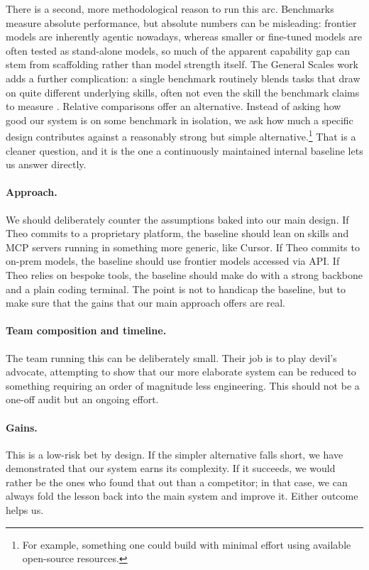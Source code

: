 There is a second, more methodological reason to run this arc. Benchmarks measure absolute performance, but absolute numbers can be misleading: frontier models are inherently agentic nowadays, whereas smaller or fine-tuned models are often tested as stand-alone models, so much of the apparent capability gap can stem from scaffolding rather than model strength itself. The General Scales work adds a further complication: a single benchmark routinely blends tasks that draw on quite different underlying skills, often not even the skill the benchmark claims to measure \cite{Zhou2026}. Relative comparisons offer an alternative. Instead of asking how good our system is on some benchmark in isolation, we ask how much a specific design contributes against a reasonably strong but simple alternative.\footnote{
    For example, something one could build with minimal effort using available open-source resources.
}
That is a cleaner question, and it is the one a continuously maintained internal baseline lets us answer directly.

\paragraph{Approach.}
We should deliberately counter the assumptions baked into our main design. If Theo commits to a proprietary platform, the baseline should lean on skills and MCP servers running in something more generic, like Cursor. If Theo commits to on-prem models, the baseline should use frontier models accessed via API. If Theo relies on bespoke tools, the baseline should make do with a strong backbone and a plain coding terminal. The point is not to handicap the baseline, but to make sure that the gains that our main approach offers are real.

\paragraph{Team composition and timeline.}
The team running this can be deliberately small. Their job is to play devil's advocate, attempting to show that our more elaborate system can be reduced to something requiring an order of magnitude less engineering. This should not be a one-off audit but an ongoing effort.

\paragraph{Gains.}
This is a low-risk bet by design. If the simpler alternative falls short, we have demonstrated that our system earns its complexity. If it succeeds, we would rather be the ones who found that out than a competitor; in that case, we can always fold the lesson back into the main system and improve it. Either outcome helps us.

